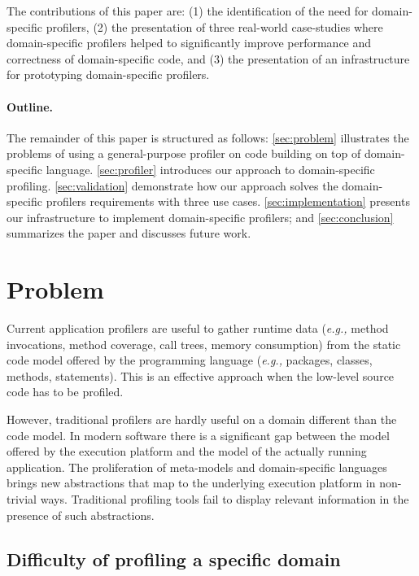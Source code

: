 \documentclass[runningheads]{llncs}
\newcommand{\eg}{\emph{e.g.,}\xspace}
\newcommand{\seclabel}[1]{\label{sec:#1}}
\begin{document}
The contributions of this paper are: (1) the identification of the need for domain-specific profilers, (2) the presentation of three real-world case-studies where domain-specific profilers helped to significantly improve performance and correctness of domain-specific code, and (3) the presentation of an infrastructure for prototyping domain-specific profilers.

\paragraph{Outline.} 
The remainder of this paper is structured as follows: \autoref{sec:problem} illustrates the problems of using a general-purpose profiler on code building on top of domain-specific language. \autoref{sec:profiler} introduces our approach to domain-specific profiling.
\autoref{sec:validation} demonstrate how our approach solves the domain-specific profilers requirements with three use cases. \autoref{sec:implementation} presents our infrastructure to implement domain-specific profilers; and \autoref{sec:conclusion} summarizes the paper and discusses future work.

\section{Problem}\seclabel{problem}

Current application profilers are useful to gather runtime data (\eg method invocations, method coverage, call trees, memory consumption) from the static code model offered by the programming language (\eg packages, classes, methods, statements). This is an effective approach when the low-level source code has to be profiled.

However, traditional profilers are hardly useful on a domain different than the code model. In modern software there is a significant gap between the model offered by the execution platform and the model of the actually running application. 
The proliferation of meta-models and domain-specific languages brings new abstractions that map to the underlying execution platform in non-trivial ways. Traditional profiling tools fail to display relevant information in the presence of such abstractions.


\subsection{Difficulty of profiling a specific domain} \label{mondrian}
\end{document}
